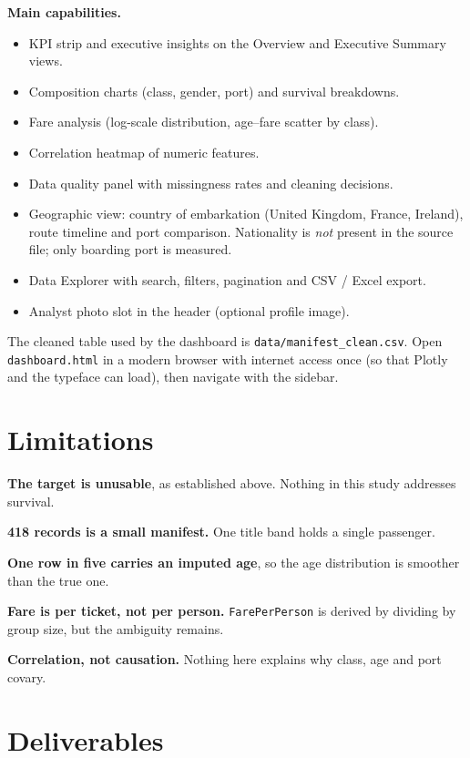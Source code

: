 \documentclass[12pt,a4paper]{article}
\newcommand{\F}[1]{\texttt{\small #1}}
\begin{document}
\noindent\textbf{Main capabilities.}
\begin{itemize}
  \item KPI strip and executive insights on the Overview and Executive Summary views.
  \item Composition charts (class, gender, port) and survival breakdowns.
  \item Fare analysis (log-scale distribution, age--fare scatter by class).
  \item Correlation heatmap of numeric features.
  \item Data quality panel with missingness rates and cleaning decisions.
  \item Geographic view: country of embarkation (United Kingdom, France, Ireland),
        route timeline and port comparison. Nationality is \emph{not} present in the
        source file; only boarding port is measured.
  \item Data Explorer with search, filters, pagination and CSV / Excel export.
  \item Analyst photo slot in the header (optional profile image).
\end{itemize}

The cleaned table used by the dashboard is \texttt{data/manifest\_clean.csv}.
Open \texttt{dashboard.html} in a modern browser with internet access once
(so that Plotly and the typeface can load), then navigate with the sidebar.

\section{Limitations}

\textbf{The target is unusable}, as established above. Nothing in this study addresses
survival.

\textbf{418 records is a small manifest.} One title band holds a single passenger.

\textbf{One row in five carries an imputed age}, so the age distribution is smoother
than the true one.

\textbf{Fare is per ticket, not per person.} \F{FarePerPerson} is derived by
dividing by group size, but the ambiguity remains.

\textbf{Correlation, not causation.} Nothing here explains why class, age and port
covary.

\section*{Deliverables}
\end{document}
